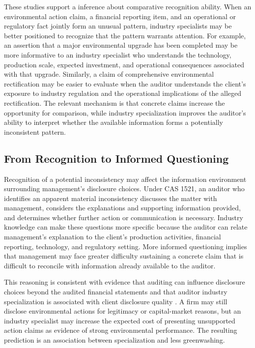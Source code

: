 \documentclass[11pt]{article}
\begin{document}
These studies support a inference about comparative recognition ability.
When an environmental action claim, a financial reporting item, and an operational or regulatory fact jointly form an unusual pattern, industry specialists may be better positioned to recognize that the pattern warrants attention.
For example, an assertion that a major environmental upgrade has been completed may be more informative to an industry specialist who understands the technology, production scale, expected investment, and operational consequences associated with that upgrade.
Similarly, a claim of comprehensive environmental rectification may be easier to evaluate when the auditor understands the client's exposure to industry regulation and the operational implications of the alleged rectification.
The relevant mechanism is that concrete claims increase the opportunity for comparison, while industry specialization improves the auditor's ability to interpret whether the available information forms a potentially inconsistent pattern.

\subsection{From Recognition to Informed Questioning}

Recognition of a potential inconsistency may affect the information environment surrounding management's disclosure choices.
Under CAS 1521, an auditor who identifies an apparent material inconsistency discusses the matter with management, considers the explanations and supporting information provided, and determines whether further action or communication is necessary.
Industry knowledge can make these questions more specific because the auditor can relate management's explanation to the client's production activities, financial reporting, technology, and regulatory setting.
More informed questioning implies that management may face greater difficulty sustaining a concrete claim that is difficult to reconcile with information already available to the auditor.

This reasoning is consistent with evidence that auditing can influence disclosure choices beyond the audited financial statements and that auditor industry specialization is associated with client disclosure quality \citep{schroeder2016impact,dunn2004audit}.
A firm may still disclose environmental actions for legitimacy or capital-market reasons, but an industry specialist may increase the expected cost of presenting unsupported action claims as evidence of strong environmental performance.
The resulting prediction is an association between specialization and less greenwashing.
\end{document}
